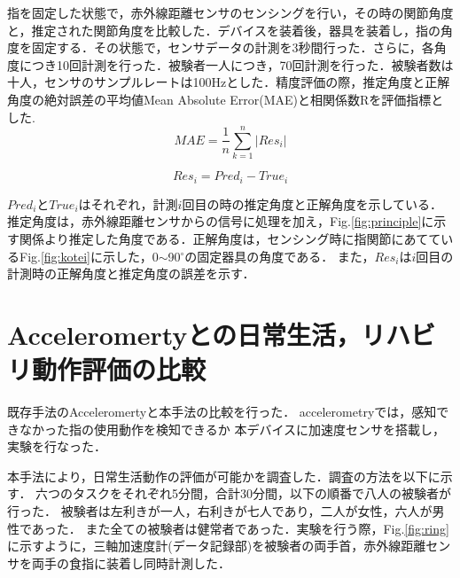 指を固定した状態で，赤外線距離センサのセンシングを行い，その時の関節角度と，推定された関節角度を比較した．デバイスを装着後，器具を装着し，指の角度を固定する．その状態で，センサデータの計測を3秒間行った．さらに，各角度につき10回計測を行った．被験者一人につき，70回計測を行った．被験者数は十人，センサのサンプルレートは100Hzとした．精度評価の際，推定角度と正解角度の絶対誤差の平均値Mean Absolute Error(MAE)と相関係数Rを評価指標とした.
\begin{equation}
MAE = \frac{1}{n} \sum^n_{k=1} |Res_i|
\label{eq:mae}
\end{equation}

\begin{equation}
Res_i = Pred_i - True_i
\label{eq:res}
\end{equation}

$Pred_iとTrue_i$はそれぞれ，計測$i$回目の時の推定角度と正解角度を示している．推定角度は，赤外線距離センサからの信号に処理を加え，Fig.\ref{fig:principle}に示す関係より推定した角度である．正解角度は，センシング時に指関節にあてているFig.\ref{fig:kotei}に示した，0$\sim$90$^\circ$の固定器具の角度である．
また，$Res_i$は$i$回目の計測時の正解角度と推定角度の誤差を示す．


\section{Acceleromertyとの日常生活，リハビリ動作評価の比較}
既存手法のAcceleromertyと本手法の比較を行った．
accelerometryでは，感知できなかった指の使用動作を検知できるか
本デバイスに加速度センサを搭載し，実験を行なった．


本手法により，日常生活動作の評価が可能かを調査した．調査の方法を以下に示す．
六つのタスクをそれぞれ5分間，合計30分間，以下の順番で八人の被験者が行った．
被験者は左利きが一人，右利きが七人であり，二人が女性，六人が男性であった．
また全ての被験者は健常者であった．実験を行う際，Fig.\ref{fig:ring}に示すように，三軸加速度計(データ記録部)を被験者の両手首，赤外線距離センサを両手の食指に装着し同時計測した．

